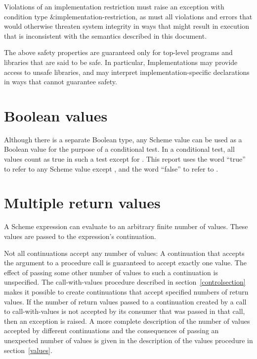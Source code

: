 Violations of an implementation restriction must raise an
exception with condition type {\cf\&implementation-restriction},
as must all
violations and errors that would otherwise threaten system
integrity in ways that might result in execution that is
inconsistent with the semantics described in this document.

The above safety properties are guaranteed only for top-level programs
and libraries that are said to be safe.  In particular, Implementations
may provide access to unsafe libraries, and may interpret
implementation-specific declarations in ways that
cannot guarantee safety.

\section{Boolean values}
\label{booleanvaluessection}

Although there is a separate Boolean type, any Scheme value can be
used as a Boolean value for the purpose of a conditional test.  In a
conditional test, all values count as true in such a test except for
\schfalse{}.  This report uses the word ``true'' to refer to any
Scheme value except \schfalse{}, and the word ``false'' to refer to
\schfalse{}.  

\section{Multiple return values}
\label{multiplereturnvaluessection}

A Scheme expression can evaluate to an arbitrary finite number of
values.  These values are passed to the expression's continuation.

Not all continuations accept any number of values: A continuation that
accepts the argument to a procedure call is guaranteed to accept
exactly one value.  The effect of passing some other number of values
to such a continuation is unspecified.  The {\cf call-with-values}
procedure
described in section~\ref{controlsection} makes it possible to create
continuations that accept specified numbers of return values.
If the number of
return values passed to a continuation created by a call to
{\cf call-with-values} is not accepted by its consumer
that was passed in that call, then an exception is raised.
A more complete description of the number of values accepted by
different continuations and the consequences of passing an unexpected
number of values is given in the description of the {\cf values}
procedure in section~\ref{values}.

